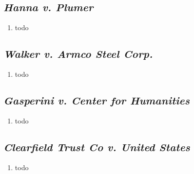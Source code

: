 \subsection{\emph{Hanna v. Plumer}}

\begin{enumerate}
    \item todo


\end{enumerate}

\subsection{\emph{Walker v. Armco Steel Corp.}}

\begin{enumerate}
    \item todo
\end{enumerate}

\subsection{\emph{Gasperini v. Center for Humanities}}

\begin{enumerate}
    \item todo
\end{enumerate}

\subsection{\emph{Clearfield Trust Co v. United States}}

\begin{enumerate}
    \item todo
\end{enumerate}
